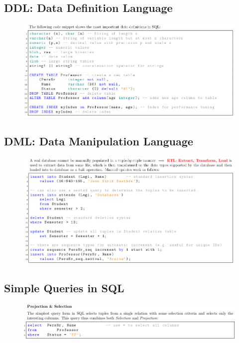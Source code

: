 \documentclass[11pt,oneside,a4paper]{article}
\begin{document}
\subsection{DDL: Data Definition Language}
\vspace{-\topsep}
\begin{figure}[hb!]
	\centering
	\includegraphics[width=1\linewidth]{figures/sql_1}
	\label{fig:sql1}
\end{figure}
\vspace{-\topsep}

\subsection{DML: Data Manipulation Language}
\vspace{-\topsep}
\begin{figure}[hb!]
	\centering
	\includegraphics[width=1\linewidth]{figures/sql_2}
	\label{fig:sql2}
\end{figure}
\vspace{-\topsep}

\subsection{Simple Queries in SQL}
\vspace{-\topsep}
\begin{figure}[hb!]
	\centering
	\includegraphics[width=1\linewidth]{figures/sql_3}
	\label{fig:sql3}
\end{figure}
\vspace{-\topsep}
\end{document}

